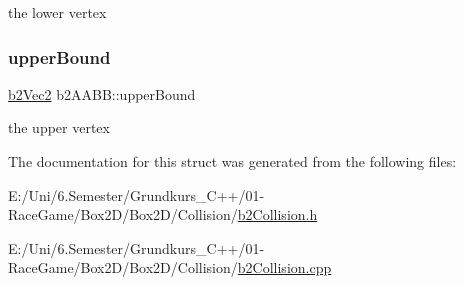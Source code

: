 the lower vertex 

\mbox{\label{structb2_a_a_b_b_ad4a8ec483ba13a2c02918b01d058a18f}} 
\subsubsection{\texorpdfstring{upperBound}{upperBound}}
{\footnotesize\ttfamily \mbox{\hyperlink{structb2_vec2}{b2\+Vec2}} b2\+A\+A\+B\+B\+::upper\+Bound}



the upper vertex 



The documentation for this struct was generated from the following files\+:\begin{DoxyCompactItemize}
\item 
E\+:/\+Uni/6.\+Semester/\+Grundkurs\+\_\+\+C++/01-\/\+Race\+Game/\+Box2\+D/\+Box2\+D/\+Collision/\mbox{\hyperlink{b2_collision_8h}{b2\+Collision.\+h}}\item 
E\+:/\+Uni/6.\+Semester/\+Grundkurs\+\_\+\+C++/01-\/\+Race\+Game/\+Box2\+D/\+Box2\+D/\+Collision/\mbox{\hyperlink{b2_collision_8cpp}{b2\+Collision.\+cpp}}\end{DoxyCompactItemize}
